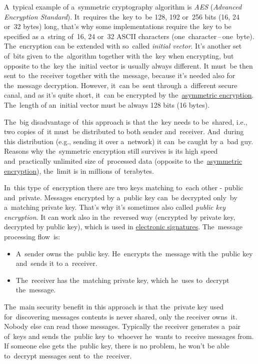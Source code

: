 A~typical example of a~symmetric cryptography algorithm is \textit{AES} (\textit{Advanced Encryption Standard}). It~requires the~key to~be 128, 192 or~256 bits (16, 24 or~32 bytes) long, that's why some implementations require the~key to be specified as a~string of~16, 24 or~32 ASCII characters (one~character\,--\,one~byte). The~encryption can be extended with so~called \textit{initial vector}. It's another set of~bits given to the~algorithm together with the~key when encrypting, but opposite to the~key the~initial vector is usually always different. It must~be then sent to~the receiver together with the~message, because it's needed also for the~message decryption. However, it~can be~sent through a~different secure canal, and as it's quite short, it~can be encrypted by the~\hyperref[asymmetricencryption]{asymmetric encryption}. The~length of an~initial vector must be always 128 bits (16 bytes).

The~big disadvantage of~this approach is that the~key needs to be~shared, i.e., two copies of~it must~be distributed to both sender and~receiver. And~during this distribution (e.g., sending it over a~network) it can~be caught by a~bad guy. Reasons why the~symmetric encryption still survives is its high speed and~practically unlimited size of~processed data (opposite to the~\hyperref[asymmetricencryption]{asymmetric encryption}), the~limit is in millions of~\mbox{terabytes}.

\label{asymmetricencryption}
In~this type of~encryption there are two keys matching to~each other - public and~private. Messages encrypted by a~public key can~be decrypted only~by a~matching private key. That's why it's sometimes also called \textit{public key encryption}. It can work also in the~reversed way (encrypted by private key, decrypted by public key), which is used in \hyperref[electronicsignature]{electronic signatures}. The~message processing flow~is:
\begin{itemize}
    \item A~sender owns the~public key. He~encrypts the~message with the~public key and~sends it to a~receiver.
    \item The~receiver has the~matching private key, which he~uses to~decrypt the~message.
\end{itemize}

\noindent The~main security benefit in this approach is that the~private key used for~discovering messages contents is never shared, only the receiver owns~it. Nobody else can read those messages. Typically the receiver generates a~pair of~keys and sends the~public key to~whoever he~wants to~receive messages from. If someone else gets the~public key, there is no problem, he won't be able to~decrypt messages sent to~the~receiver.

